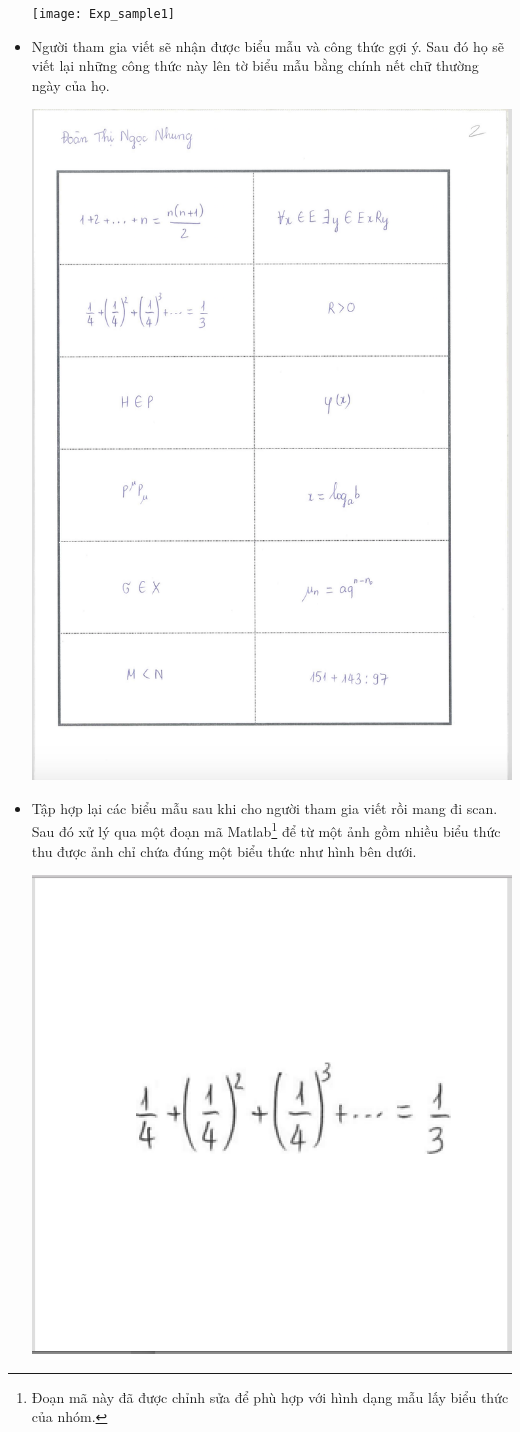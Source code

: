 \documentclass[a4paper,12pt]{article}
\begin{document}
\begin{itemize}
		\begin{center}
			\centering
			\texttt{[image: Exp\_sample1]}
			\vspace{0.5cm}
		\end{center}
		\item Người tham gia viết sẽ nhận được biểu mẫu và công thức gợi ý. Sau đó họ sẽ viết lại những công thức này lên tờ biểu mẫu bằng chính nết chữ thường ngày của họ. 
		\begin{center}
			\centering
			\includegraphics[width=0.8\linewidth]{Exp_sample_vd}
			\vspace{0.5cm}
		\end{center}
		\item Tập hợp lại các biểu mẫu sau khi cho người tham gia viết rồi mang đi scan. Sau đó xử lý qua một đoạn mã Matlab\cite{qak}\footnote{Đoạn mã này đã được chỉnh sửa để phù hợp với hình dạng mẫu lấy biểu thức của nhóm.} để từ một ảnh gồm nhiều biểu thức thu được ảnh chỉ chứa đúng một biểu thức như hình bên dưới.
		\begin{center}
			\centering
			\includegraphics[width=0.5\linewidth]{EXP_2017_072_2A.png}

\end{center}
\end{itemize}
\end{document}
